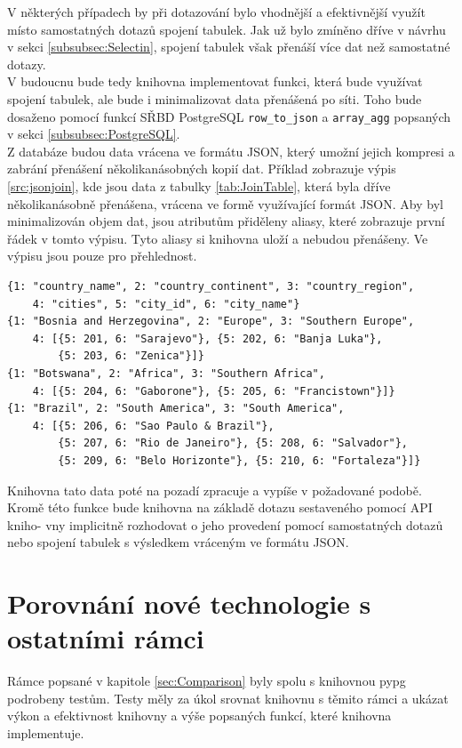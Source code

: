 \documentclass[ing,male,java,dept456]{diploma}						%
\begin{document}
V některých případech by při dotazování bylo vhodnější a efektivnější využít místo samostatných dotazů spojení tabulek. Jak už bylo zmíněno dříve v návrhu v sekci \ref{subsubsec:Selectin}, spojení tabulek však přenáší více dat než samostatné dotazy. \\ 
V budoucnu bude tedy knihovna implementovat funkci, která bude využívat spojení tabulek, ale bude i minimalizovat data přenášená po síti. Toho bude dosaženo pomocí funkcí SŘBD PostgreSQL \lstinline[style=inlinepython]|row_to_json| a \lstinline[style=inlinepython]|array_agg| popsaných v sekci \ref{subsubsec:PostgreSQL}. \\
Z databáze budou data vrácena ve formátu JSON, který umožní jejich kompresi a zabrání přenášení několikanásobných kopií dat. Příklad zobrazuje výpis \ref{src:jsonjoin}, kde jsou data z tabulky \ref{tab:JoinTable}, která byla dříve několikanásobně přenášena, vrácena ve formě využívající formát JSON. Aby byl minimalizován objem dat, jsou atributům přiděleny aliasy, které zobrazuje první řádek v tomto výpisu. Tyto aliasy si knihovna uloží a nebudou přenášeny. Ve výpisu jsou pouze pro přehlednost. \\
\begin{lstlisting}[style=custompython, label=src:jsonjoin, caption={Minimalizace přenášených dat z tabulky \ref{tab:JoinTable} pomocí formátu JSON}]
{1: "country_name", 2: "country_continent", 3: "country_region", 
	4: "cities", 5: "city_id", 6: "city_name"}
{1: "Bosnia and Herzegovina", 2: "Europe", 3: "Southern Europe", 
	4: [{5: 201, 6: "Sarajevo"}, {5: 202, 6: "Banja Luka"}, 
		{5: 203, 6: "Zenica"}]}
{1: "Botswana", 2: "Africa", 3: "Southern Africa", 
	4: [{5: 204, 6: "Gaborone"}, {5: 205, 6: "Francistown"}]}
{1: "Brazil", 2: "South America", 3: "South America", 
	4: [{5: 206, 6: "Sao Paulo & Brazil"}, 
		{5: 207, 6: "Rio de Janeiro"}, {5: 208, 6: "Salvador"}, 
		{5: 209, 6: "Belo Horizonte"}, {5: 210, 6: "Fortaleza"}]}
\end{lstlisting}

Knihovna tato data poté na pozadí zpracuje a vypíše v požadované podobě. \\
Kromě této funkce bude knihovna na základě dotazu sestaveného pomocí API kniho- vny implicitně rozhodovat o jeho provedení pomocí samostatných dotazů nebo spojení tabulek s výsledkem vráceným ve formátu JSON.

\section{Porovnání nové technologie s ostatními rámci}
\label{sec:Bench}
Rámce popsané v kapitole \ref{sec:Comparison} byly spolu s knihovnou pypg podrobeny testům. Testy měly za úkol srovnat knihovnu s těmito rámci a ukázat výkon a efektivnost knihovny a výše popsaných funkcí, které knihovna implementuje.
\end{document}
